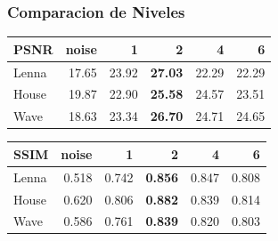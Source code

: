 \documentclass{beamer}
\begin{document}
  \begin{frame}
    \frametitle{ Comparacion de Niveles }
    \centering
    \begin{tabular}{lrrrrr}
      \toprule
      {PSNR} &  noise &      1 &      2 &      4 &      6 \\
      \midrule
      Lenna &  17.65 &  23.92 &  \bf{27.03} &  22.29 &  22.29 \\
      House &  19.87 &  22.90 &  \bf{25.58} &  24.57 &  23.51 \\
      Wave &  18.63 &  23.34 &  \bf{26.70} &  24.71 &  24.65 \\
      \bottomrule
      \end{tabular}
  
      \begin{tabular}{lrrrrr}
        {SSIM} &  noise &      1 &      2 &      4 &      6 \\
        \midrule
        Lenna &  0.518 &  0.742 &  \bf{0.856} &  0.847 &  0.808 \\
        House &  0.620 &  0.806 &  \bf{0.882} &  0.839 &  0.814 \\
        Wave &  0.586 &  0.761 &  \bf{0.839} &  0.820 &  0.803 \\
        \bottomrule
        \end{tabular}

  \end{frame}
\end{document}
